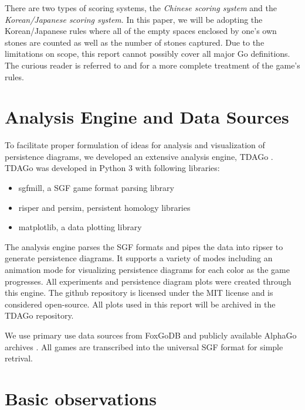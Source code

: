 \documentclass[11pt]{article}
\begin{document}
There are two types of scoring systems, the \textit{Chinese scoring system} and the \textit{Korean/Japanese scoring system}. In this paper, we will be adopting the Korean/Japanese rules where all of the empty spaces enclosed by one's own stones are counted as well as the number of stones captured. Due to the limitations on scope, this report cannot possibly cover all major Go definitions. The curious reader is referred to \cite{muller} and \cite{terms} for a more complete treatment of the game's rules.

\section{Analysis Engine and Data Sources}

To facilitate proper formulation of ideas for analysis and visualization of persistence diagrams, we developed an extensive analysis engine, TDAGo \cite{tdago}. TDAGo was developed in Python 3 with following libraries:
\begin{itemize}
   \item sgfmill, a SGF game format parsing library
   \item risper and persim, persistent homology libraries
   \item matplotlib, a data plotting library
\end{itemize}

The analysis engine parses the SGF formats and pipes the data into ripser to generate persistence diagrams. It supports a variety of modes including an animation mode for visualizing persistence diagrams for each color as the game progresses. All experiments and persistence diagram plots were created through this engine. The github repository is licensed under the MIT license and is considered open-source. All plots used in this report will be archived in the TDAGo repository.

We use primary use data sources from FoxGoDB \cite{fox} and publicly available AlphaGo archives \cite{alphalib}. All games are transcribed into the universal SGF format for simple retrival.

\section{Basic observations}
\end{document}
